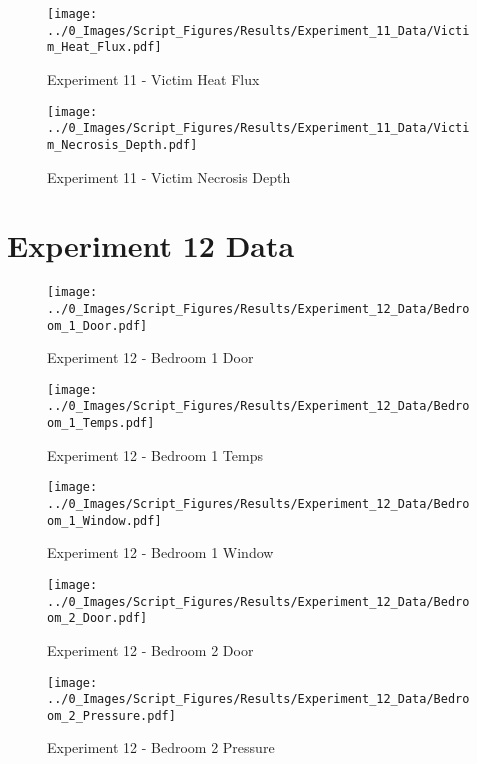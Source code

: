 	\begin{figure}[H]
		\centering
		\texttt{[image: ../0\_Images/Script\_Figures/Results/Experiment\_11\_Data/Victim\_Heat\_Flux.pdf]}
		\caption[]{Experiment 11 - Victim Heat Flux}
	\end{figure}
 
	\clearpage

	\begin{figure}[H]
		\centering
		\texttt{[image: ../0\_Images/Script\_Figures/Results/Experiment\_11\_Data/Victim\_Necrosis\_Depth.pdf]}
		\caption[]{Experiment 11 - Victim Necrosis Depth}
	\end{figure}
 

\clearpage		\large
\section{Experiment 12 Data} \label{App:Exp12Results} 

	\begin{figure}[H]
		\centering
		\texttt{[image: ../0\_Images/Script\_Figures/Results/Experiment\_12\_Data/Bedroom\_1\_Door.pdf]}
		\caption[]{Experiment 12 - Bedroom 1 Door}
	\end{figure}
 

	\begin{figure}[H]
		\centering
		\texttt{[image: ../0\_Images/Script\_Figures/Results/Experiment\_12\_Data/Bedroom\_1\_Temps.pdf]}
		\caption[]{Experiment 12 - Bedroom 1 Temps}
	\end{figure}
 
	\clearpage

	\begin{figure}[H]
		\centering
		\texttt{[image: ../0\_Images/Script\_Figures/Results/Experiment\_12\_Data/Bedroom\_1\_Window.pdf]}
		\caption[]{Experiment 12 - Bedroom 1 Window}
	\end{figure}
 

	\begin{figure}[H]
		\centering
		\texttt{[image: ../0\_Images/Script\_Figures/Results/Experiment\_12\_Data/Bedroom\_2\_Door.pdf]}
		\caption[]{Experiment 12 - Bedroom 2 Door}
	\end{figure}
 
	\clearpage

	\begin{figure}[H]
		\centering
		\texttt{[image: ../0\_Images/Script\_Figures/Results/Experiment\_12\_Data/Bedroom\_2\_Pressure.pdf]}
		\caption[]{Experiment 12 - Bedroom 2 Pressure}
	\end{figure}
 

